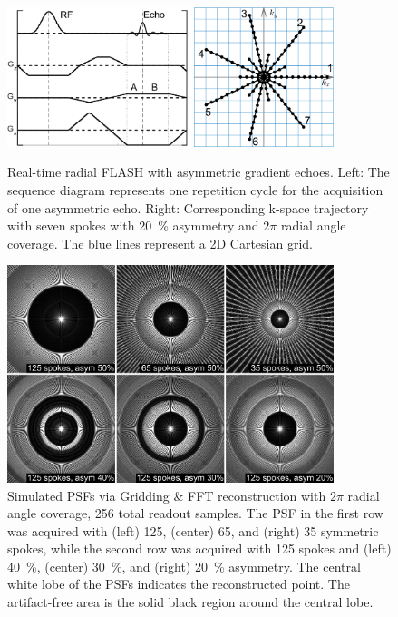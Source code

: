 \begin{figure}[p]
  \centering
  \includegraphics[width=0.85\textwidth]{fig/asym-echo-seq-ksp.png}
  \caption{Real-time radial FLASH with asymmetric gradient echoes. Left: The sequence diagram represents one repetition cycle for the acquisition of one asymmetric echo. Right: Corresponding k-space trajectory with seven spokes with \SI{20}{\percent} asymmetry and $2\pi$ radial angle coverage. The blue lines represent a 2D Cartesian grid. } \label{Fig:aysm-echo-seq-ksp}
  
  \par\bigskip
  
  \includegraphics[width=0.85\textwidth]{fig/asym-echo-psf.png}
  \caption{Simulated \acsp{PSF} via Gridding \& FFT reconstruction with $2\pi$ radial angle coverage, 256 total readout samples. The \acs{PSF} in the first row was acquired with (left) \num{125}, (center) \num{65}, and (right) \num{35} symmetric spokes, while the second row was acquired with 125 spokes and (left) \SI{40}{\percent}, (center) \SI{30}{\percent}, and (right) \SI{20}{\percent} asymmetry. The central white lobe of the \acsp{PSF} indicates the reconstructed point. The artifact-free area is the solid black region around the central lobe.} \label{Fig:aysm-echo-psf}
\end{figure}

